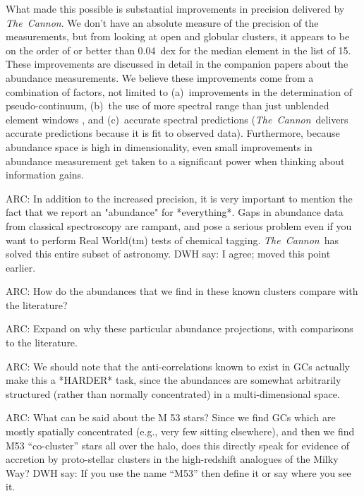 \documentclass[12pt, letterpaper, preprint]{aastex}
\newcommand{\project}[1]{\textsl{#1}}
\newcommand{\thecannon}{\project{The~Cannon}}
\begin{document}
What made this possible is substantial improvements in precision
delivered by \thecannon.
We don't have an absolute measure of the precision of the measurements,
but from looking at open and globular clusters, it appears to be on the
order of or better than 0.04~dex for the median element in the list of 15.
These improvements are discussed in detail in the companion papers
\citep{casey16, ness16} about the abundance measurements.
We believe these improvements come from a combination of factors, not
limited to (a)~improvements in the determination of pseudo-continuum,
(b)~the use of more spectral range than just unblended element windows
\citep{aspcap}, and (c)~accurate spectral predictions
(\thecannon\ delivers accurate predictions because it is fit to
observed data).
Furthermore, because abundance space is high in dimensionality, even
small improvements in abundance measurement get taken to a significant
power when thinking about information gains.

ARC: In addition to the increased precision, it is very important to
	mention the fact that we report an "abundance" for *everything*.
	Gaps in abundance data from classical spectroscopy are rampant,
	and pose a serious problem even if you want to perform Real World(tm)
	tests of chemical tagging. \thecannon\ has solved this entire
	subset of astronomy.  DWH say: I agree; moved this point earlier.

	
ARC: How do the abundances that we find in these known clusters compare
	with the literature?

ARC: Expand on why these particular abundance projections, with
	comparisons to the literature.

ARC: We should note that the anti-correlations known to exist in GCs
	actually make this a *HARDER* task, since the abundances are
	somewhat arbitrarily structured (rather than normally concentrated)
	in a multi-dimensional space.

ARC: What can be said about the M 53 stars? Since we find GCs which are
	mostly spatially concentrated (e.g., very few sitting elsewhere),
	and then we find M53 ``co-cluster'' stars all over the halo, does this
	directly speak for evidence of accretion by proto-stellar clusters
	in the high-redshift analogues of the Milky Way?  DWH say: If you use the name ``M53'' then define it or say where you see it.
\end{document}
